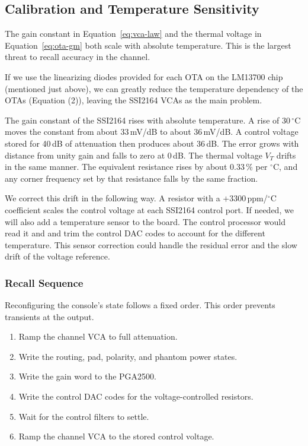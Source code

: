 \documentclass[11pt, letterpaper,titlepage]{article}
\begin{document}
\subsection{Calibration and Temperature Sensitivity}
\label{sssec:temperature}

The gain constant in Equation~\eqref{eq:vca-law} and the thermal voltage in
Equation~\eqref{eq:ota-gm} both scale with absolute temperature. This is the
largest threat to recall accuracy in the channel.

If we use the linearizing diodes provided for each OTA on the LM13700 chip (mentioned just above), we can greatly reduce the temperature dependency of the OTAs (Equation (2)), leaving the SSI2164 VCAs as the main problem.

The gain constant of the SSI2164 rises with absolute temperature. A rise of
30\,$^\circ$C moves the constant from about 33\,mV/dB to about 36\,mV/dB. A
control voltage stored for 40\,dB of attenuation then produces about 36\,dB.
The error grows with distance from unity gain and falls to zero at 0\,dB. The
thermal voltage $V_T$ drifts in the same manner. The equivalent resistance
rises by about 0.33\,\% per $^\circ$C, and any corner frequency set by that
resistance falls by the same fraction.

We correct this drift in the following way. A resistor with a $+3300$\,ppm/$^\circ$C
coefficient scales the control voltage at each SSI2164 control port. If needed, we will also add a temperature sensor to the board. The
control processor would read it and and trim the
control DAC codes to account for the different temperature. This sensor correction could handle the residual error and the
slow drift of the voltage reference.



\subsubsection*{Recall Sequence}
\label{sssec:recall}

Reconfiguring the console's state follows a fixed order. This order prevents transients at the output.

\begin{enumerate}
    \item Ramp the channel VCA to full attenuation.
    \item Write the routing, pad, polarity, and phantom power states.
    \item Write the gain word to the PGA2500.
    \item Write the control DAC codes for the voltage-controlled resistors.
    \item Wait for the control filters to settle.
    \item Ramp the channel VCA to the stored control voltage.
\end{enumerate}
\end{document}
